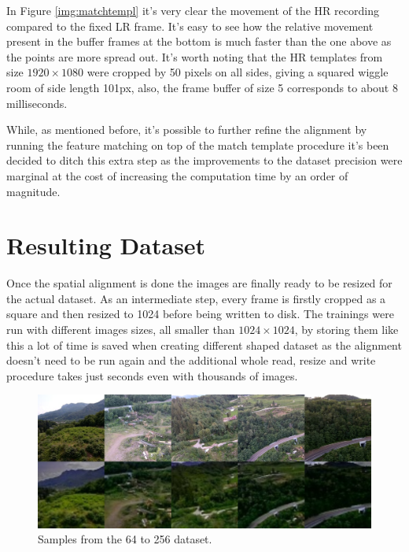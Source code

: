 In Figure \ref{img:matchtempl} it's very clear the movement of the HR recording compared to the fixed LR frame. It's easy to see how the relative movement present in the buffer frames at the bottom is much faster than the one above as the points are more spread out. It's worth noting that the HR templates from size \(1920\times1080\) were cropped by 50 pixels on all sides, giving a squared wiggle room of side length 101px, also, the frame buffer of size 5 corresponds to about 8 milliseconds.

While, as mentioned before, it's possible to further refine the alignment by running the feature matching on top of the match template procedure it's been decided to ditch this extra step as the improvements to the dataset precision were marginal at the cost of increasing the computation time by an order of magnitude.

\section{Resulting Dataset}
\label{sec:final_dataset}

Once the spatial alignment is done the images are finally ready to be resized for the actual dataset. As an intermediate step, every frame is firstly cropped as a square and then resized to 1024 before being written to disk. The trainings were run with different images sizes, all smaller than  \(1024\times1024\), by storing them like this a lot of time is saved when creating different shaped dataset as the alignment doesn't need to be run again and the additional whole read, resize and write procedure takes just seconds even with thousands of images.


\begin{figure}[H]
  \centering
  \includegraphics[width=1\textwidth]{figures/final_64_256.png}
  \caption{Samples from the 64 to 256 dataset.}
  \label{img:64_256}
\end{figure}


